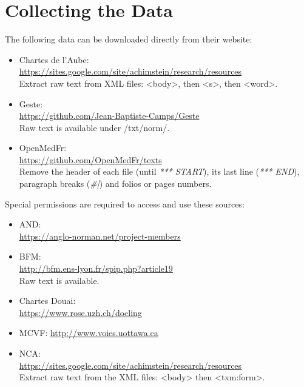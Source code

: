 \section{Collecting the Data}
\label{subsec:collectdata}
The following data can be downloaded directly from their website:
\begin{itemize}
    \item Chartes de l'Aube: \\ \url{https://sites.google.com/site/achimstein/research/resources} \\
          Extract raw text from XML files: <body>, then <s>, then <word>.
    \item Geste: \\ \url{https://github.com/Jean-Baptiste-Camps/Geste} \\
          Raw text is available under /txt/norm/.
    \item OpenMedFr: \\ \url{https://github.com/OpenMedFr/texts} \\
          Remove the header of each file (until \textit{*** START}), its last line (\textit{*** END}), paragraph breaks (\textit{\#|}) and folios or pages numbers.
\end{itemize}

Special permissions are required to access and use these sources:
\begin{itemize}
    \item AND: \\ \url{https://anglo-norman.net/project-members}
    \item BFM: \\ \url{http://bfm.ens-lyon.fr/spip.php?article19} \\
          Raw text is available.
    \item Chartes Douai: \\
          \url{https://www.rose.uzh.ch/docling}
    \item MCVF: \url{http://www.voies.uottawa.ca}
    \item NCA: \\ \url{https://sites.google.com/site/achimstein/research/resources} \\
          Extract raw text from the XML files: <body> then <txm:form>.
\end{itemize}


